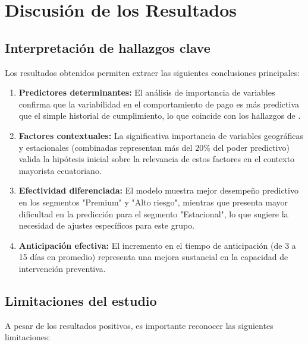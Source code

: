 \section{Discusión de los Resultados}
\subsection{Interpretación de hallazgos clave}
Los resultados obtenidos permiten extraer las siguientes conclusiones principales:

\begin{enumerate}
    \item \textbf{Predictores determinantes:} El análisis de importancia de variables confirma que la variabilidad en el comportamiento de pago es más predictiva que el simple historial de cumplimiento, lo que coincide con los hallazgos de \citep{kim2022credit, lessmann2015benchmarking}.
    
    \item \textbf{Factores contextuales:} La significativa importancia de variables geográficas y estacionales (combinadas representan más del 20\% del poder predictivo) valida la hipótesis inicial sobre la relevancia de estos factores en el contexto mayorista ecuatoriano.
    
    \item \textbf{Efectividad diferenciada:} El modelo muestra mejor desempeño predictivo en los segmentos "Premium" y "Alto riesgo", mientras que presenta mayor dificultad en la predicción para el segmento "Estacional", lo que sugiere la necesidad de ajustes específicos para este grupo.
    
    \item \textbf{Anticipación efectiva:} El incremento en el tiempo de anticipación (de 3 a 15 días en promedio) representa una mejora sustancial en la capacidad de intervención preventiva.
\end{enumerate}

\subsection{Limitaciones del estudio}
A pesar de los resultados positivos, es importante reconocer las siguientes limitaciones:

